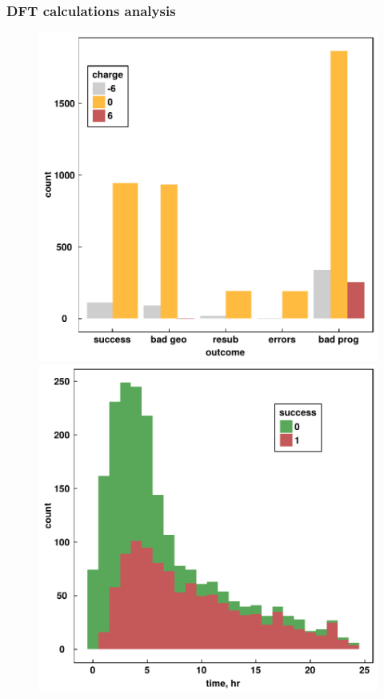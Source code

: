 \documentclass[xcolor=dvipsnames]{beamer}
\begin{document}
\begin{frame}
\frametitle{DFT calculations analysis}
\begin{figure}[ht] 
	\begin{minipage}[b]{0.5\linewidth}
		\centering
		\includegraphics[width=.8\linewidth]{img/fateByCharge.pdf} 
	\end{minipage}%
	\begin{minipage}[b]{0.5\linewidth}
		\centering
		\includegraphics[width=.8\linewidth]{img/timeByfate.pdf} 
	\end{minipage} 
\end{figure}
\end{frame}
\end{document}
